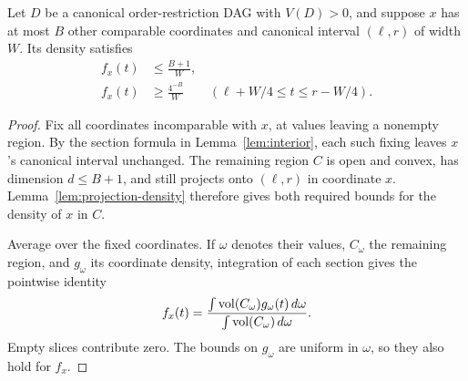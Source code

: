 \begin{lemma}\label{lem:fiber}
Let $D$ be a canonical order-restriction DAG with $V(D)>0$, and suppose
$x$ has at most
$B$ other comparable coordinates and canonical interval $(\ell,r)$ of
width $W$. Its density satisfies
\begin{align}
f_x(t)&\le\frac{B+1}{W},\label{eq:fiber-upper}\\
f_x(t)&\ge\frac{4^{-B}}{W}
\qquad(\ell+W/4\le t\le r-W/4).\label{eq:fiber-lower}
\end{align}
\end{lemma}
\begin{proof}
Fix all coordinates incomparable with $x$, at values leaving a nonempty
region. By the section formula in Lemma~\ref{lem:interior}, each such
fixing leaves $x$'s canonical interval unchanged. The remaining region
$C$ is open and convex, has dimension $d\le B+1$, and still projects
onto $(\ell,r)$ in coordinate $x$. Lemma~\ref{lem:projection-density}
therefore gives both required bounds for the density of $x$ in $C$.

Average over the fixed coordinates. If $\omega$ denotes their values,
$C_\omega$ the remaining region, and $g_\omega$ its coordinate density,
integration of each section gives the pointwise identity
\[
f_x(t)=
\frac{\int \operatorname{vol}(C_\omega)g_\omega(t)\,d\omega}
     {\int \operatorname{vol}(C_\omega)\,d\omega}.
\]
Empty slices contribute zero. The bounds on $g_\omega$ are uniform in
$\omega$, so they also hold for $f_x$.
\end{proof}

